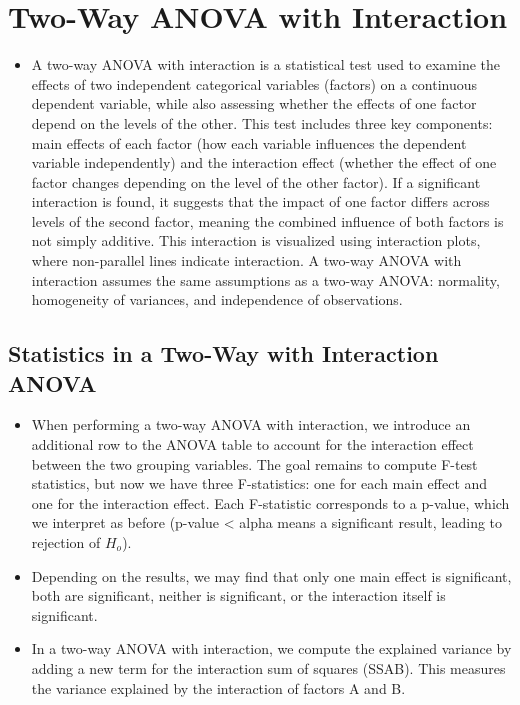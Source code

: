 \documentclass[
  letterpaper,
  DIV=11,
  numbers=noendperiod]{scrreprt}
\providecommand{\tightlist}{%
  \setlength{\itemsep}{0pt}\setlength{\parskip}{0pt}}\usepackage{longtable,booktabs,array}
\begin{document}

\chapter{Two-Way ANOVA with
Interaction}\label{two-way-anova-with-interaction}

\begin{itemize}
\tightlist
\item
  A two-way ANOVA with interaction is a statistical test used to examine
  the effects of two independent categorical variables (factors) on a
  continuous dependent variable, while also assessing whether the
  effects of one factor depend on the levels of the other. This test
  includes three key components: main effects of each factor (how each
  variable influences the dependent variable independently) and the
  interaction effect (whether the effect of one factor changes depending
  on the level of the other factor). If a significant interaction is
  found, it suggests that the impact of one factor differs across levels
  of the second factor, meaning the combined influence of both factors
  is not simply additive. This interaction is visualized using
  interaction plots, where non-parallel lines indicate interaction. A
  two-way ANOVA with interaction assumes the same assumptions as a
  two-way ANOVA: normality, homogeneity of variances, and independence
  of observations.
\end{itemize}

\section{Statistics in a Two-Way with Interaction
ANOVA}\label{statistics-in-a-two-way-with-interaction-anova}

\begin{itemize}
\item
  When performing a two-way ANOVA with interaction, we introduce an
  additional row to the ANOVA table to account for the interaction
  effect between the two grouping variables. The goal remains to compute
  F-test statistics, but now we have three F-statistics: one for each
  main effect and one for the interaction effect. Each F-statistic
  corresponds to a p-value, which we interpret as before (p-value
  \textless{} alpha means a significant result, leading to rejection of
  \(H_o\)).
\item
  Depending on the results, we may find that only one main effect is
  significant, both are significant, neither is significant, or the
  interaction itself is significant.
\item
  In a two-way ANOVA with interaction, we compute the explained variance
  by adding a new term for the interaction sum of squares (SSAB). This
  measures the variance explained by the interaction of factors A and B.
\end{itemize}
\end{document}
